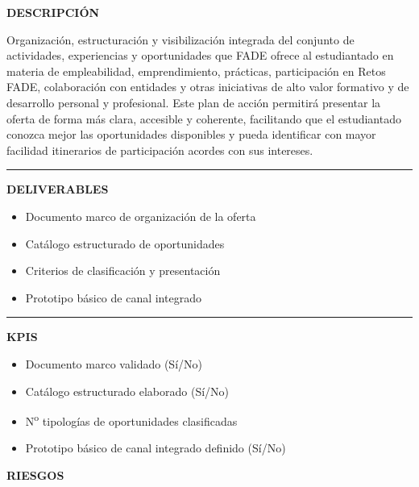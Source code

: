 \documentclass[11pt,a4paper]{scrreprt}
\newcommand{\fieldlabel}[1]{%
  {\footnotesize\sffamily\bfseries\color{mutedcolor}\MakeUppercase{#1}}\par\nopagebreak[4]
}
\newcommand{\fieldsep}{\vspace{3pt}\noindent\textcolor{bordercolor}{\rule{\linewidth}{0.4pt}}\vspace{3pt}\par}
\begin{document}
\begin{tcolorbox}[pabox={filcolor}{PA2.1 \enspace\textbullet\enspace Organización y visibilización integrada de la oferta de oportunidades para el estudiantado}]

\fieldlabel{Descripci\'on}
{\small Organización, estructuración y visibilización integrada del conjunto de actividades, experiencias y oportunidades que FADE ofrece al estudiantado en materia de empleabilidad, emprendimiento, prácticas, participación en Retos FADE, colaboración con entidades y otras iniciativas de alto valor formativo y de desarrollo personal y profesional. Este plan de acción permitirá presentar la oferta de forma más clara, accesible y coherente, facilitando que el estudiantado conozca mejor las oportunidades disponibles y pueda identificar con mayor facilidad itinerarios de participación acordes con sus intereses. }\par
\fieldsep
\fieldlabel{Deliverables}
{\small \begin{itemize}[noitemsep,topsep=2pt]
\item Documento marco de organización de la oferta
\item Catálogo estructurado de oportunidades
\item Criterios de clasificación y presentación
\item Prototipo básico de canal integrado
\end{itemize}}\par
\fieldsep
\fieldlabel{KPIs}
{\small \begin{itemize}[noitemsep,topsep=2pt]
\item Documento marco validado (Sí/No)
\item Catálogo estructurado elaborado (Sí/No)
\item N\textsuperscript{o} tipologías de oportunidades clasificadas
\item Prototipo básico de canal integrado definido (Sí/No)
\end{itemize}}\par
\end{tcolorbox}
\begin{tcolorbox}[riskbox]
{\footnotesize\sffamily\bfseries\color{red!50!black} RIESGOS}\par{}
\end{tcolorbox}
\end{document}
